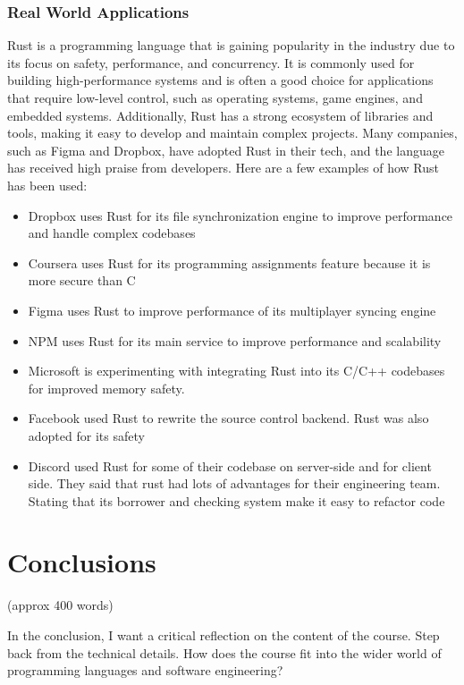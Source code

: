 \documentclass{article}
\theoremstyle{theorem}
\theoremstyle{definition}
\theoremstyle{remark}
\begin{document}
\subsubsection{Real World Applications}
Rust is a programming language that is gaining popularity in the industry due to its focus on safety, performance, and concurrency. It is commonly used for building high-performance systems and is often a good choice for applications that require low-level control, such as operating systems, game engines, and embedded systems. Additionally, Rust has a strong ecosystem of libraries and tools, making it easy to develop and maintain complex projects. Many companies, such as Figma and Dropbox, have adopted Rust in their tech, and the language has received high praise from developers. Here are a few examples of how Rust has been used:
\begin{itemize}
\item Dropbox uses Rust for its file synchronization engine to improve performance and handle complex codebases
\item Coursera uses Rust for its programming assignments feature because it is more secure than C
\item Figma uses Rust to improve performance of its multiplayer syncing engine
\item NPM uses Rust for its main service to improve performance and scalability
\item Microsoft is experimenting with integrating Rust into its C/C++ codebases for improved memory safety.
\item Facebook used Rust to rewrite the source control backend. Rust was also adopted for its safety
\item Discord used Rust for some of their codebase on server-side and for client side. They said that rust had lots of advantages for their engineering team. Stating that its borrower and checking system make it easy to refactor code
\end{itemize}


\section{Conclusions}\label{conclusions}

(approx 400 words)

In the conclusion, I want a critical reflection on the content of the course. Step back from the technical details. How does the course fit into the wider world of programming languages and software engineering?
\end{document}

